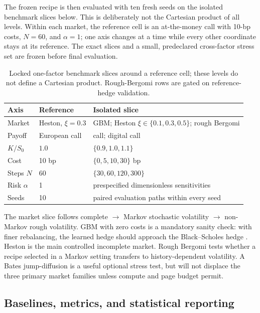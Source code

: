 \documentclass[sigconf,balance=false]{acmart}
\begin{document}
The frozen recipe is then evaluated with ten fresh seeds on the isolated
benchmark slices below.  This is deliberately not the Cartesian product of all
levels.  Within each market, the reference cell is an at-the-money call with
10-bp costs, $N=60$, and $\alpha=1$; one axis changes at a time while every
other coordinate stays at its reference.  The exact slices and a small,
predeclared cross-factor stress set are frozen before final evaluation.

\begin{table}[t]
  \caption{Locked one-factor benchmark slices around a reference cell; these
  levels do not define a Cartesian product.  Rough-Bergomi rows are gated on
  reference-hedge validation.}
  \label{tab:matrix}
  \small
  \begin{tabular}{@{}p{}p{}p{}@{}}
    \toprule
    Axis & Reference & Isolated slice \\
    \midrule
    Market & Heston, $\xi=0.3$ & GBM; Heston
      $\xi\in\{0.1,0.3,0.5\}$; rough Bergomi \\
    Payoff & European call & call; digital call \\
    $K/S_0$ & $1.0$ & $\{0.9,1.0,1.1\}$ \\
    Cost & 10 bp & $\{0,5,10,30\}$ bp \\
    Steps $N$ & 60 & $\{30,60,120,300\}$ \\
    Risk $\alpha$ & 1 & prespecified dimensionless sensitivities \\
    Seeds & 10 & paired evaluation paths within every seed \\
    \bottomrule
  \end{tabular}
\end{table}

The market slice follows complete $\rightarrow$ Markov stochastic volatility
$\rightarrow$ non-Markov rough volatility.  GBM with zero costs is a mandatory
sanity check: with finer rebalancing, the
learned hedge should approach the Black--Scholes hedge
\cite{black1973pricing}.  Heston is the main controlled incomplete market.
Rough Bergomi tests whether a recipe selected in a Markov setting transfers to
history-dependent volatility.  A Bates jump-diffusion
\cite{bates1996jumps} is a useful optional stress test, but will not displace
the three primary market families unless compute and page budget permit.

\subsection{Baselines, metrics, and statistical reporting}
\end{document}
